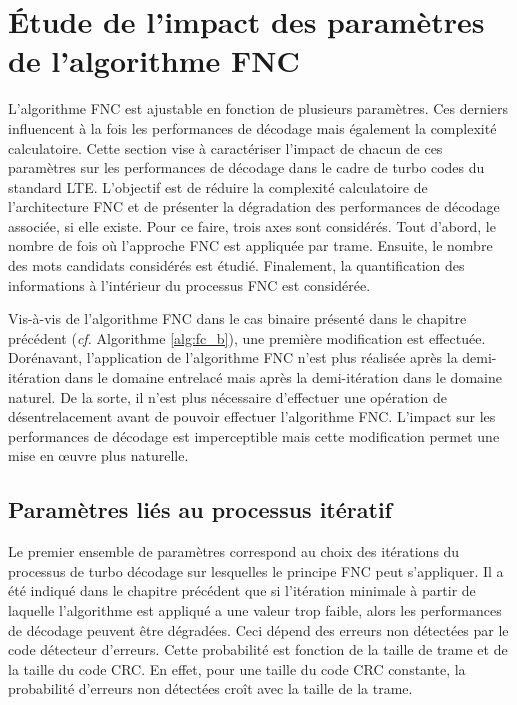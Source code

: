 \section{Étude de l'impact des paramètres de l'algorithme FNC}
L'algorithme FNC est ajustable en fonction de plusieurs paramètres. Ces derniers influencent à la fois les performances de décodage mais également
la complexité calculatoire. Cette section vise à caractériser l'impact de chacun de ces paramètres sur les performances de 
décodage dans le cadre de turbo codes du standard LTE. L'objectif est de réduire la complexité calculatoire de 
l'architecture FNC et de présenter la dégradation des performances de décodage associée, si elle existe. Pour ce faire, 
trois axes sont considérés. Tout d'abord, le nombre de fois où l'approche FNC est appliquée par trame. Ensuite, 
le nombre des mots candidats considérés est étudié. Finalement, la quantification des informations à l'intérieur du 
processus FNC est considérée.

Vis-à-vis de l'algorithme FNC dans le cas binaire présenté dans le chapitre précédent (\textit{cf.} Algorithme \ref{alg:fc_b}), une première modification est effectuée. 
Dorénavant, l'application de l'algorithme FNC n'est plus réalisée après la demi-itération dans le domaine
entrelacé mais après la demi-itération dans le domaine naturel. De la sorte, il n'est plus nécessaire d'effectuer une 
opération de désentrelacement avant de pouvoir effectuer l'algorithme FNC. L'impact sur les performances de décodage est
imperceptible mais cette modification permet une mise en œuvre plus naturelle.

\subsection{Paramètres liés au processus itératif}
Le premier ensemble de paramètres correspond au choix des itérations du processus de turbo décodage sur lesquelles le 
principe FNC peut s'appliquer. Il a été indiqué dans le chapitre précédent que si l'itération minimale à partir de 
laquelle l'algorithme est appliqué a une valeur trop faible, alors les performances de décodage peuvent être dégradées. Ceci dépend 
des erreurs non détectées par le code détecteur d'erreurs. Cette probabilité est fonction de la taille de trame et de la 
taille du code CRC. En effet, pour une taille du code CRC constante, la probabilité d'erreurs non détectées croît avec la
taille de la trame. 

